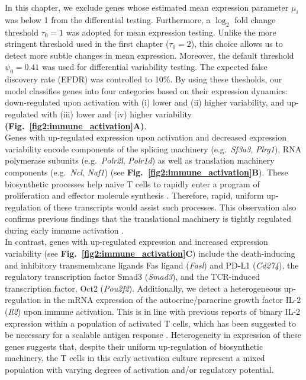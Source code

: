 In this chapter, we exclude genes whose estimated mean expression parameter $\mu_i$ was below 1 from the differential testing. Furthermore, a $\log_2$ fold change threshold $\tau_0 = 1$ was adopted for mean expression testing. Unlike the more stringent threshold used in the first chapter ($\tau_0 = 2$), this choice allows us to detect more subtle changes in mean expression. Moreover, the default threshold $\psi_0 = 0.41$ was used for differential variability testing. The expected false discovery rate (EFDR) was controlled to 10\%. By using these thesholds, our model classifies genes into four categories based on their expression dynamics: down-regulated upon activation with (i) lower and (ii) higher variability, and up-regulated with (iii) lower and (iv) higher variability \textbf{(Fig.~\ref{fig2:immune_activation}A)}. \\

Genes with up-regulated expression upon activation and decreased expression variability encode components of the splicing machinery (e.g.~\textit{Sf3a3}, \textit{Plrg1}), RNA polymerase subunits (e.g.~\textit{Polr2l}, \textit{Polr1d}) as well as translation machinery components (e.g.~\textit{Ncl}, \textit{Naf1}) (see \textbf{Fig.~\ref{fig2:immune_activation}B}). These biosynthetic processes help naive T cells to rapidly enter a program of proliferation and effector molecule synthesis \citep{Tan2017,Araki2017}. Therefore, rapid, uniform up-regulation of these transcripts would assist such processes. This observation also confirms previous findings that the translational machinery is tightly regulated during early immune activation \citep{Martinez-jimenez2017}.\\ 

In contrast, genes with up-regulated expression and increased expression variability (see \textbf{Fig.~\ref{fig2:immune_activation}C}) include the death-inducing and inhibitory transmembrane ligands Fas ligand (\textit{Fasl}) and PD-L1 (\textit{Cd274}), the regulatory transcription factor Smad3 (\textit{Smad3}), and the TCR-induced transcription factor, Oct2 (\textit{Pou2f2}). Additionally, we detect a heterogeneous up-regulation in the mRNA expression of the autocrine/paracrine growth factor IL-2 (\textit{Il2}) upon immune activation. This is in line with previous reports of binary IL-2 expression within a population of activated T cells, which has been suggested to be necessary for a scalable antigen response \citep{Fuhrmann2016}. Heterogeneity in expression of these genes suggests that, despite their uniform up-regulation of biosynthetic machinery, the T cells in this early activation culture represent a mixed population with varying degrees of activation and/or regulatory potential. \\

